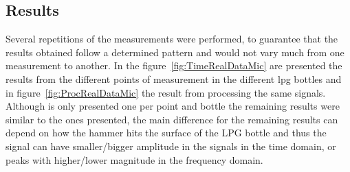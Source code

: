 \subsection{Results}
Several repetitions of the measurements were performed, to guarantee that the results obtained follow a determined pattern and would not vary much from one measurement to another. In the figure~\ref{fig:TimeRealDataMic} are presented the results from the different points of measurement in the different \acrshort{lpg} bottles and in figure~\ref{fig:ProcRealDataMic} the result from processing the same signals. Although is only presented one per point and bottle the remaining results were similar to the ones presented, the main difference for the remaining results can depend on how the hammer hits the surface of the LPG bottle and thus the signal can have smaller/bigger amplitude in the signals in the time domain, or peaks with higher/lower magnitude in the frequency domain.

